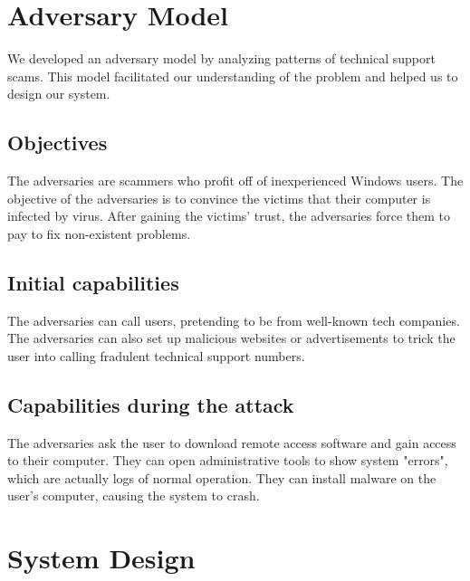 \documentclass[final]{IEEEtran}
\begin{document}
\section{Adversary Model} %
We developed an adversary model by analyzing patterns of technical support scams. This model facilitated our understanding of the problem and helped us to design our system.
\subsection{Objectives}
The adversaries are scammers who profit off of inexperienced Windows users. The objective of the adversaries is to convince the victims that their computer is infected by virus. After gaining the victims' trust, the adversaries force them to pay to fix non-existent problems. 
\subsection{Initial capabilities}
The adversaries can call users, pretending to be from well-known tech companies. The adversaries can also set up malicious websites or advertisements to trick the user into calling fradulent technical support numbers. 
\subsection{Capabilities during the attack}
The adversaries ask the user to download remote access software and gain access to their computer. They can open administrative tools to show system "errors", which are actually logs of normal operation. They can install malware on the user's computer, causing the system to crash.

\section{System Design} %
\end{document}
